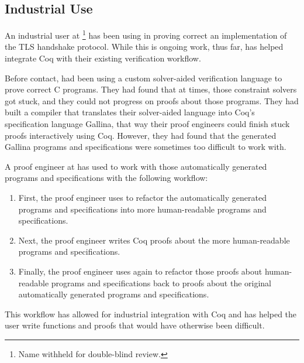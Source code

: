 
\subsection{Industrial Use}
\label{sec:industry}

An industrial user at \company\footnote{Name withheld for double-blind review.} has been using \toolname in proving
correct an implementation of the TLS handshake protocol.
While this is ongoing work, thus far,
\toolname has helped \company integrate Coq with their existing verification workflow.

Before contact, \company had been using a custom solver-aided verification language to prove correct C programs.
They had found that at times, those constraint solvers got stuck, and they could not
progress on proofs about those programs.
They had built a compiler that translates their solver-aided language into Coq's specification language Gallina,
that way their proof engineers could finish stuck proofs interactively using Coq.
However, they had found that the generated Gallina programs and specifications were sometimes too difficult to work with.

A proof engineer at \company has used \toolname to work with those automatically generated programs and specifications
with the following workflow:

\begin{enumerate}
\item First, the proof engineer uses \toolname to refactor the automatically generated programs and specifications into more
human-readable programs and specifications.
\item Next, the proof engineer writes Coq proofs about the more human-readable programs and specifications.
\item Finally, the proof engineer uses \toolname again to refactor those proofs about human-readable programs and specifications back to
proofs about the original automatically generated programs and specifications.
\end{enumerate}
This workflow has allowed for industrial integration with Coq and has helped the user write functions and proofs
that would have otherwise been difficult.

